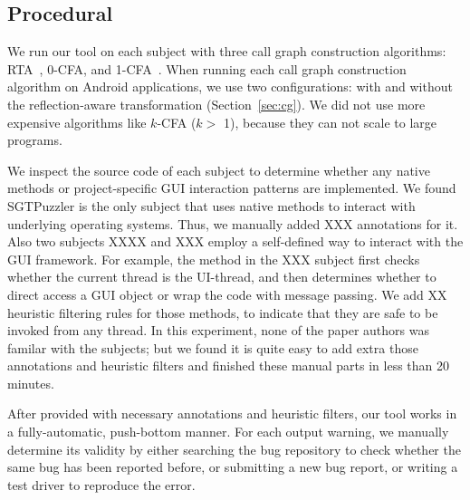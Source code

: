 \subsection{Procedural}
\label{sec:procedural}

We run our tool on each subject with three call graph construction
algorithms: RTA~\cite{rta}, 0-CFA, and 1-CFA~\cite{kcfa}.  When running
each call graph construction algorithm on Android applications, we
use two configurations: with and without the reflection-aware transformation
(Section~\ref{sec:cg}).  We did not use more expensive algorithms like $k$-CFA ($k >$ 1),
because they can not scale to large programs.

We inspect the source code of each subject to determine whether any
native methods or project-specific GUI interaction patterns are implemented.
We found SGTPuzzler is the only subject that uses native methods to interact with
underlying operating systems. Thus, we manually added XXX 
annotations for it. Also two subjects XXXX and XXX employ a self-defined
way to interact with the GUI framework. For example, the 
method in the XXX subject first checks whether the current thread is the UI-thread, and
then determines whether to direct access a GUI object or wrap the code with
message passing. We add XX heuristic filtering rules for those methods, to indicate
that they are safe to be invoked from any thread. In this experiment, none of the paper
authors was familar with the subjects; but we found it is quite easy
to add extra those annotations and heuristic filters and finished these
manual parts in less than 20 minutes.

After provided with necessary annotations and heuristic filters,
our tool works in a fully-automatic, push-bottom manner. For each output
warning, we manually determine its validity by either searching the
bug repository to check whether the same bug has been reported before,
or submitting a new bug report, or writing a test driver to reproduce
the error.



